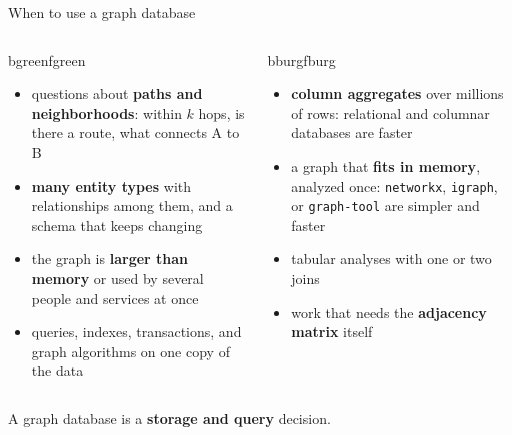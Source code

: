 \documentclass[aspectratio=169, 10pt]{beamer}
\begin{document}
\begin{frame}[fragile]{When to use a graph database}
  \vspace{0.2cm}
  \begin{columns}[T]
      \begin{tbox}{bgreen}{fgreen}
        \begin{itemize}
          \item questions about \textbf{paths and neighborhoods}: within $k$ hops, is there a route, what connects A to B
          \item \textbf{many entity types} with relationships among them, and a schema that keeps changing
          \item the graph is \textbf{larger than memory} or used by several people and services at once
          \item queries, indexes, transactions, and graph algorithms on one copy of the data
        \end{itemize}
      \end{tbox}
      \begin{tbox}{bburg}{fburg}
        \begin{itemize}
          \item \textbf{column aggregates} over millions of rows: relational and columnar databases are faster
          \item a graph that \textbf{fits in memory}, analyzed once: \texttt{networkx}, \texttt{igraph}, or \texttt{graph-tool} are simpler and faster
          \item tabular analyses with one or two joins
          \item work that needs the \textbf{adjacency matrix} itself
        \end{itemize}
      \end{tbox}
  \end{columns}
  \vspace{0.4cm}
  \centering
  A graph database is a \textbf{storage and query} decision.
\end{frame}
\end{document}
